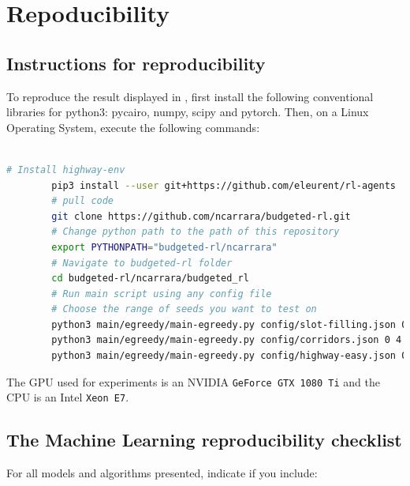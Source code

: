 \section{Repoducibility}

\subsection{Instructions for reproducibility}
\label{subsubsec:instruction-reproducibility}
To reproduce the result displayed in , first install the following conventional libraries for python3: pycairo, numpy, scipy and pytorch. Then, on a Linux Operating System, execute the following commands:\\
\\
\begin{minipage}{\linewidth}
    \begin{lstlisting}[language=bash,label={fig:instructions},title={Instructions to reproduce experiments},breaklines,captionpos=b]
        # Install highway-env
        pip3 install --user git+https://github.com/eleurent/rl-agents
        # pull code
        git clone https://github.com/ncarrara/budgeted-rl.git
        # Change python path to the path of this repository
        export PYTHONPATH="budgeted-rl/ncarrara"
        # Navigate to budgeted-rl folder
        cd budgeted-rl/ncarrara/budgeted_rl
        # Run main script using any config file
        # Choose the range of seeds you want to test on
        python3 main/egreedy/main-egreedy.py config/slot-filling.json 0 6
        python3 main/egreedy/main-egreedy.py config/corridors.json 0 4
        python3 main/egreedy/main-egreedy.py config/highway-easy.json 0 10
    \end{lstlisting}
\end{minipage}

The \gls{GPU} used for experiments is an NVIDIA \texttt{GeForce GTX 1080 Ti} and the \gls{CPU} is an Intel \texttt{Xeon E7}.


\subsection{The Machine Learning reproducibility checklist}
\label{sec:ml-checklist}
For all models and algorithms presented, indicate if you include:

